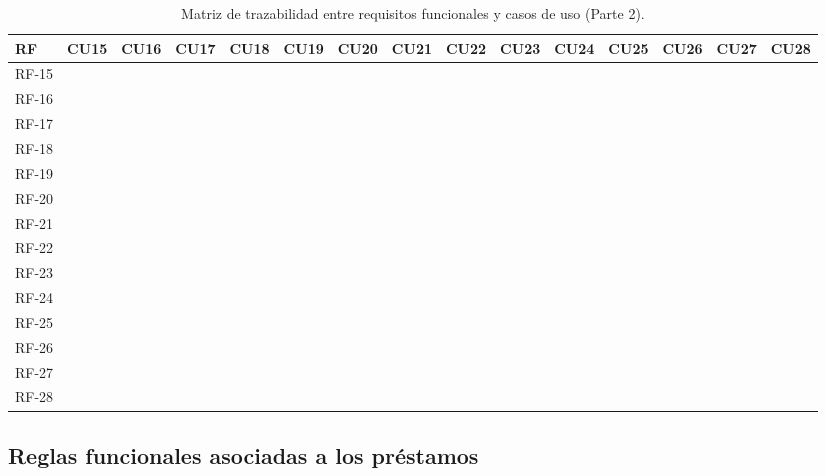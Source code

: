 \begin{table}[H]
	\centering
	\caption{Matriz de trazabilidad entre requisitos funcionales y casos de uso (Parte 2).}
	\label{tab:trazabilidad_rf_cu_2}
	\scriptsize
	\setlength{\tabcolsep}{3pt}
	\begin{tabularx}{\textwidth}{l *{14}{c}}
		\toprule
		\textbf{RF} & \textbf{CU15} & \textbf{CU16} & \textbf{CU17} & \textbf{CU18} & \textbf{CU19} & \textbf{CU20} & \textbf{CU21} & \textbf{CU22} & \textbf{CU23} & \textbf{CU24} & \textbf{CU25} & \textbf{CU26} & \textbf{CU27} & \textbf{CU28} \\
		\midrule
		RF-15 & & & & & & & \checkmark & & & & & & & \\
		\addlinespace
		RF-16 & \checkmark & \checkmark & \checkmark & & & & & & & & & & & \\
		\addlinespace
		RF-17 & \checkmark & \checkmark & \checkmark & & & & & & & & & & & \\
		\addlinespace
		RF-18 & & & & \checkmark & & & & & & & & & & \\
		\addlinespace
		RF-19 & & & & \checkmark & \checkmark & & & & & & & & & \\
		\addlinespace
		RF-20 & & & & \checkmark & & \checkmark & & & & & & & & \\
		\addlinespace
		RF-21 & & & & & & & & & & \checkmark & \checkmark & & & \\
		\addlinespace
		RF-22 & & & & & & & & & & \checkmark & & & & \\
		\addlinespace
		RF-23 & & & & & & & & & & \checkmark & & & & \checkmark \\
		\addlinespace
		RF-24 & & & & & & & & & & & \checkmark & & & \\
		\addlinespace
		RF-25 & & & & & & & & & & & & & \checkmark & \checkmark \\
		\addlinespace
		RF-26 & & & & & & & & & & & & \checkmark & & \checkmark \\
		\addlinespace
		RF-27 & & & & & & & & & & & & & & \checkmark \\
		\addlinespace
		RF-28 & & & & & & & & \checkmark & \checkmark & & & & & \\
		\bottomrule
	\end{tabularx}
\end{table}

\subsection{Reglas funcionales asociadas a los préstamos}

